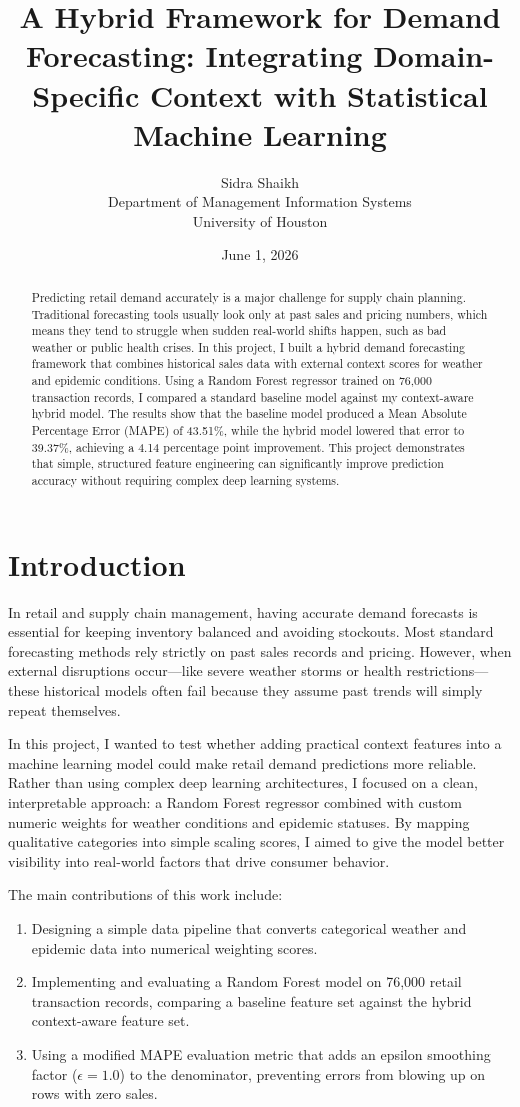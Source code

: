 \documentclass[12pt]{article}
\title{A Hybrid Framework for Demand Forecasting: Integrating Domain-Specific Context with Statistical Machine Learning}
\author{Sidra Shaikh \\ Department of Management Information Systems \\ University of Houston}
\date{June 1, 2026}
\begin{document}
\maketitle

\begin{abstract}
Predicting retail demand accurately is a major challenge for supply chain planning. Traditional forecasting tools usually look only at past sales and pricing numbers, which means they tend to struggle when sudden real-world shifts happen, such as bad weather or public health crises. In this project, I built a hybrid demand forecasting framework that combines historical sales data with external context scores for weather and epidemic conditions. Using a Random Forest regressor trained on 76,000 transaction records, I compared a standard baseline model against my context-aware hybrid model. The results show that the baseline model produced a Mean Absolute Percentage Error (MAPE) of 43.51\%, while the hybrid model lowered that error to 39.37\%, achieving a 4.14 percentage point improvement. This project demonstrates that simple, structured feature engineering can significantly improve prediction accuracy without requiring complex deep learning systems.
\end{abstract}

\section{Introduction}
In retail and supply chain management, having accurate demand forecasts is essential for keeping inventory balanced and avoiding stockouts. Most standard forecasting methods rely strictly on past sales records and pricing. However, when external disruptions occur—like severe weather storms or health restrictions—these historical models often fail because they assume past trends will simply repeat themselves.

In this project, I wanted to test whether adding practical context features into a machine learning model could make retail demand predictions more reliable. Rather than using complex deep learning architectures, I focused on a clean, interpretable approach: a Random Forest regressor combined with custom numeric weights for weather conditions and epidemic statuses. By mapping qualitative categories into simple scaling scores, I aimed to give the model better visibility into real-world factors that drive consumer behavior.

The main contributions of this work include:
\begin{enumerate}
    \item Designing a simple data pipeline that converts categorical weather and epidemic data into numerical weighting scores.
    \item Implementing and evaluating a Random Forest model on 76,000 retail transaction records, comparing a baseline feature set against the hybrid context-aware feature set.
    \item Using a modified MAPE evaluation metric that adds an epsilon smoothing factor ($\epsilon = 1.0$) to the denominator, preventing errors from blowing up on rows with zero sales.
\end{enumerate}
\end{document}
